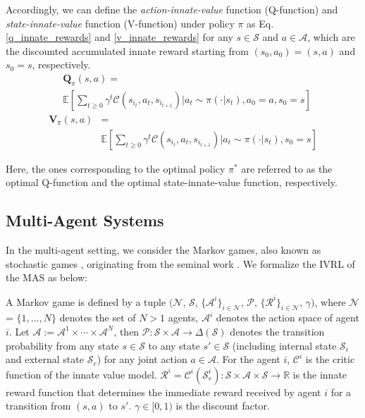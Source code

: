 \documentclass[letterpaper]{article} %
\begin{document}
Accordingly, we can define the \textit{action-innate-value} function (Q-function) and \textit{state-innate-value} function (V-function) under policy $\pi$ as Eq. \eqref{q_innate_rewards} and \eqref{v_innate_rewards} for any $s \in \mathcal{S}$ and $a \in \mathcal{A}$, which are the discounted accumulated innate reward starting from $(s_0, a_0) = (s, a)$ and $s_0 = s$, respectively.
\begin{equation}
\begin{split}
    & \mathbf{Q}_\pi (s, a) = \\
    & \mathbb{E} \left[\sum_{t \geq 0} \gamma^t \mathcal{C}(s_{i_t}, a_t, s_{i_{t+1}}) \bigg\vert a_t \sim \pi(\cdot \vert s_t), a_0 = a, s_0 = s \right]
\label{q_innate_rewards}
\end{split}
\end{equation}
\begin{equation}
\begin{split}
    \mathbf{V}_\pi (s, a) & = \\
    & \mathbb{E} \left[\sum_{t \geq 0} \gamma^t \mathcal{C}(s_{i_t}, a_t, s_{i_{t+1}}) \bigg\vert a_t \sim \pi(\cdot \vert s_t), s_0 = s \right]
\label{v_innate_rewards}
\end{split}
\end{equation}

Here, the ones corresponding to the optimal policy $\pi^*$ are referred to as the optimal Q-function and the optimal state-innate-value function, respectively.

\subsection{Multi-Agent Systems}

In the multi-agent setting, we consider the Markov games, also known as stochastic games \cite{shapley1953stochastic}, originating from the seminal work \cite{littman1994markov}. We formalize the IVRL of the MAS as below:

A Markov game is defined by a tuple $(\mathcal{N}$, $\mathcal{S}$, $\{\mathcal{A}^i\}_{i \in \mathcal{N}}$, $\mathcal{P}$, $\{\mathcal{R}^i\}_{i \in \mathcal{N}}$, $\gamma)$, where $\mathcal{N}$ = $\{1, \dots, N \}$ denotes the set of $N > 1$ agents, $\mathcal{A}^i$ denotes the action space of agent $i$. Let $\mathcal{A} := \mathcal{A}^1 \times \cdots \times \mathcal{A}^N$, then $\mathcal{P}: \mathcal{S} \times \mathcal{A} \rightarrow \Delta(\mathcal{S})$ denotes the transition probability from any state $s \in \mathcal{S}$ to any state $s' \in \mathcal{S}$ (including internal state $\mathcal{S}_i$ and external state $\mathcal{S}_e$) for any joint action $a \in \mathcal{A}$. For the agent $i$, $\mathcal{C}^i$ is the critic function of the innate value model. $\mathcal{R}^i = \mathcal{C}^i(\mathcal{S}_e^i): \mathcal{S} \times \mathcal{A} \times \mathcal{S} \rightarrow \mathbb{R}$ is the innate reward function that determines the immediate reward received by agent $i$ for a transition from $(s, a)$ to $s'$. $\gamma \in [0, 1)$ is the discount factor.
\end{document}
